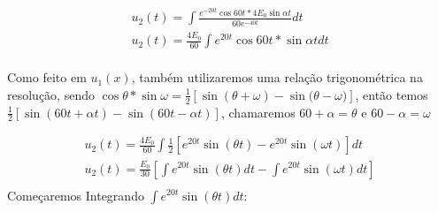 \documentclass{abntex2}
\begin{document}
\begin{eqnarray*}
    u_2(t) = \int\frac{e^{-20t}\cos{60t}*4E_0\sin{{\alpha}t}}{60e^{-40t}}dt\\
    u_2(t) = \frac{4E_0}{60}\int{e^{20t}\cos{60t}*\sin{{\alpha}t}}dt\\
\end{eqnarray*}

\newpage
\Large Como feito em $u_1(x)$, também utilizaremos uma relação trigonométrica na resolução, sendo $\cos{\theta}*\sin{\omega} = \frac{1}{2}[\sin{(\theta+\omega)} - \sin{(\theta-\omega})]$, então temos $\frac{1}{2}[\sin{(60t+\alpha t)} - \sin{(60t-\alpha t)}]$, chamaremos $60 + \alpha = \theta$ e $60 - \alpha = \omega$

\begin{eqnarray*}
    u_2(t) = \frac{4E_0}{60}{\int}\frac{1}{2}\left[e^{20t}\sin{(\theta t)} - e^{20t}\sin{(\omega t)}\right]dt\\
    u_2(t) = \frac{E_0}{30}\left[{\int}e^{20t}\sin{(\theta t)}dt - \int e^{20t}\sin{(\omega t)}dt\right]\\
\end{eqnarray*}
\Large Começaremos Integrando ${\int}e^{20t}\sin{(\theta t)}dt$:\
\end{document}
